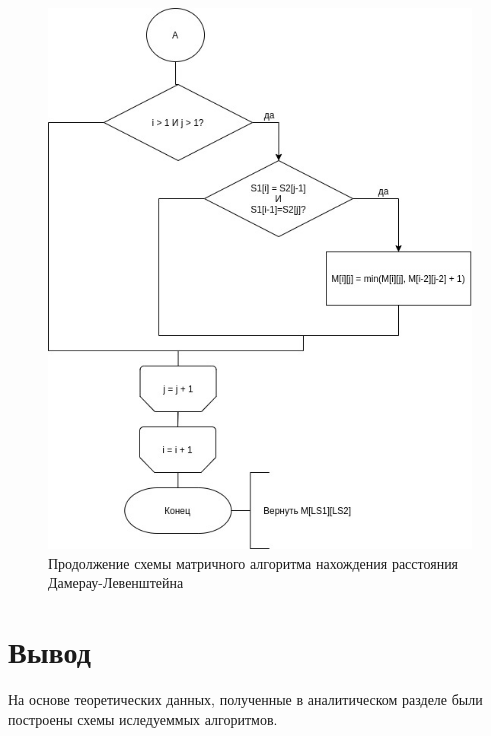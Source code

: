 \begin{figure}[h]
	\centering
	\includegraphics[scale=0.7]{schemes/DamLevBottom.jpg}
	\caption{Продолжение схемы матричного алгоритма нахождения расстояния Дамерау-Левенштейна}
	\label{scheme:damlevmatrbottom}
\end{figure}

\section{Вывод}
	На основе теоретических данных, полученные в аналитическом разделе были построены схемы иследуеммых  алгоритмов.
